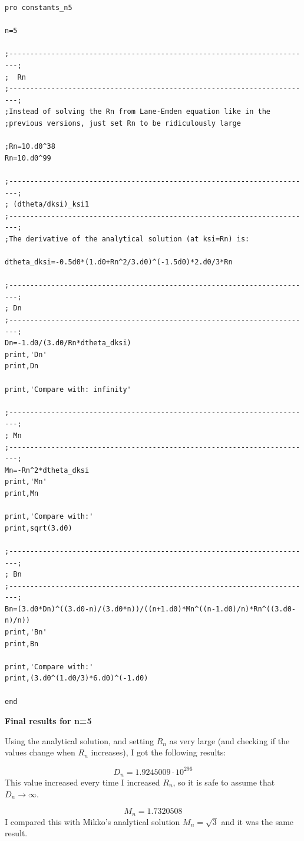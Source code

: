 \documentclass[a4paper,12pt]{article}
\begin{document}
\begin{itemize}
\begin{scriptsize}
\begin{verbatim}
pro constants_n5

n=5

;------------------------------------------------------------------------;
;  Rn
;------------------------------------------------------------------------;
;Instead of solving the Rn from Lane-Emden equation like in the
;previous versions, just set Rn to be ridiculously large

;Rn=10.d0^38
Rn=10.d0^99

;------------------------------------------------------------------------;
; (dtheta/dksi)_ksi1
;------------------------------------------------------------------------;
;The derivative of the analytical solution (at ksi=Rn) is:

dtheta_dksi=-0.5d0*(1.d0+Rn^2/3.d0)^(-1.5d0)*2.d0/3*Rn

;------------------------------------------------------------------------;
; Dn
;------------------------------------------------------------------------;
Dn=-1.d0/(3.d0/Rn*dtheta_dksi)
print,'Dn'
print,Dn

print,'Compare with: infinity'

;------------------------------------------------------------------------;
; Mn
;------------------------------------------------------------------------;
Mn=-Rn^2*dtheta_dksi
print,'Mn'
print,Mn

print,'Compare with:'
print,sqrt(3.d0)

;------------------------------------------------------------------------;
; Bn
;------------------------------------------------------------------------;
Bn=(3.d0*Dn)^((3.d0-n)/(3.d0*n))/((n+1.d0)*Mn^((n-1.d0)/n)*Rn^((3.d0-n)/n))
print,'Bn'
print,Bn

print,'Compare with:'
print,(3.d0^(1.d0/3)*6.d0)^(-1.d0)

end
\end{verbatim}
\end{scriptsize}

\vspace{0.5cm}
\textbf{Final results for n=5}

Using the analytical solution, and setting $R_n$ as very large (and checking if the values change when $R_n$ increases), I got the following results:

$$D_n=1.9245009 \cdot 10^{296}$$
This value increased every time I increased $R_n$, so it is safe to assume that $D_n \to \infty$.

$$M_n=1.7320508$$
I compared this with Mikko's analytical solution $M_n=\sqrt{3}$ and it was the same result.


\end{itemize}
\end{document}
